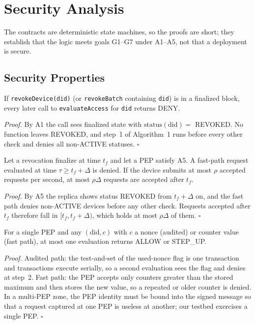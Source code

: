 \section{Security Analysis}\label{sec:security}
The contracts are deterministic state machines, so the proofs are short; they establish that the logic meets goals G1--G7 under A1--A5, not that a deployment is secure.

\subsection{Security Properties}\label{sec:props}
\begin{proposition}\label{prop:revoke}
If \texttt{revokeDevice(did)} (or \texttt{revokeBatch} containing \texttt{did}) is in a finalized block, every later call to \texttt{evaluateAccess} for \texttt{did} returns DENY.
\end{proposition}
\emph{Proof.} By A1 the call sees finalized state with $\mathrm{status}(\mathrm{did})=$ REVOKED. No function leaves REVOKED, and step~1 of Algorithm~1 runs before every other check and denies all non-ACTIVE statuses. \hfill$\square$

\begin{proposition}\label{prop:stale}
Let a revocation finalize at time $t_f$ and let a PEP satisfy A5. A fast-path request evaluated at time $\tau\ge t_f+\Delta$ is denied. If the device submits at most $\rho$ accepted requests per second, at most $\rho\Delta$ requests are accepted after $t_f$.
\end{proposition}
\emph{Proof.} By A5 the replica shows status REVOKED from $t_f+\Delta$ on, and the fast path denies non-ACTIVE devices before any other check. Requests accepted after $t_f$ therefore fall in $[t_f,t_f+\Delta)$, which holds at most $\rho\Delta$ of them. \hfill$\square$

\begin{proposition}\label{prop:replay}
For a single PEP and any $(\mathrm{did},c)$ with $c$ a nonce (audited) or counter value (fast path), at most one evaluation returns ALLOW or STEP\_UP.
\end{proposition}
\emph{Proof.} Audited path: the test-and-set of the used-nonce flag is one transaction and transactions execute serially, so a second evaluation sees the flag and denies at step~2. Fast path: the PEP accepts only counters greater than the stored maximum and then stores the new value, so a repeated or older counter is denied. In a multi-PEP zone, the PEP identity must be bound into the signed message so that a request captured at one PEP is useless at another; our testbed exercises a single PEP. \hfill$\square$

